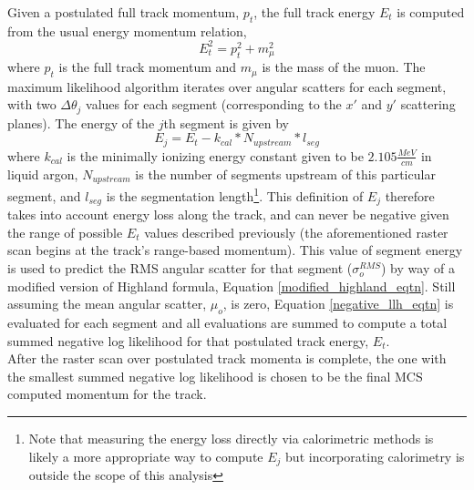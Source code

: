 Given a postulated full track momentum, $p_t$, the full track energy $E_t$ is computed from the usual energy momentum relation,
\begin{equation}\label{energy_momentum_relation_eqtn}
E_t^2 = p_t^2 + m_\mu^2
\end{equation}
 where $p_t$ is the full track momentum and $m_\mu$ is the mass of the muon. The maximum likelihood algorithm iterates over angular scatters for each segment, with two $\Delta\theta_j$ values for each segment (corresponding to the $x'$ and $y'$ scattering planes). The energy of the $j$th segment is given by
\begin{equation}\label{segment_E_equation}
E_{j} = E_t - k_{cal}*N_{upstream}*l_{seg}
\end{equation}
where $k_{cal}$ is the minimally ionizing energy constant given to be $2.105 \frac{MeV}{cm}$ in liquid argon\cite{MIPenergysource}, $N_{upstream}$ is the number of segments upstream of this particular segment, and $l_{seg}$ is the segmentation length\footnote{Note that measuring the energy loss directly via calorimetric methods is likely a more appropriate way to compute $E_j$ but incorporating calorimetry is outside the scope of this analysis}. This definition of $E_j$ therefore takes into account energy loss along the track, and can never be negative given the range of possible $E_t$ values described previously (the aforementioned raster scan begins at the track's range-based momentum). This value of segment energy is used to predict the RMS angular scatter for that segment ($\sigma_o^{RMS}$) by way of a modified version of Highland formula, Equation \ref{modified_highland_eqtn}. Still assuming the mean angular scatter, $\mu_o$, is zero, Equation \ref{negative_llh_eqtn} is evaluated for each segment and all evaluations are summed to compute a total summed negative log likelihood for that postulated track energy, $E_t$.\\

After the raster scan over postulated track momenta is complete, the one with the smallest summed negative log likelihood is chosen to be the final MCS computed momentum for the track.
